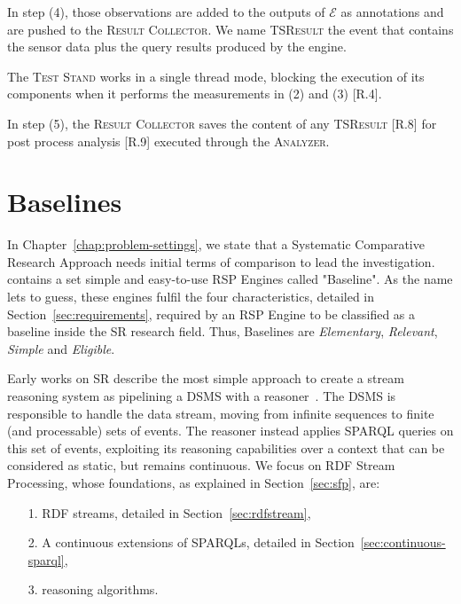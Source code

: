 In step (4), those observations are added to the outputs of $\mathcal{E}$ as annotations and are pushed to the \textsc{Result Collector}.  We name \textsc{TSResult} the event that contains the sensor data plus the query results produced by the engine.  

The \textsc{Test Stand} works in a single thread mode, blocking the execution of its components when it performs the measurements in (2) and (3) [R.4].  

In step (5), the \textsc{Result Collector} saves the content of any \textsc{TSResult} [R.8] for post process analysis [R.9] executed through the \textsc{Analyzer}.

\section{Baselines}\label{sec:baselines}

\noindent In Chapter~\ref{chap:problem-settings}, we state that a Systematic Comparative Research Approach needs initial terms of comparison to lead the investigation. \name contains a set simple and easy-to-use RSP Engines called "Baseline". As the name lets to guess, these engines fulfil the four characteristics, detailed in Section~\ref{sec:requirements}, required by an RSP Engine to be classified as a baseline inside the SR research field. Thus, \name Baselines are \textit{Elementary}, \textit{Relevant}, \textit{Simple} and \textit{Eligible}.

Early works on SR describe the most simple approach to create a stream reasoning system as pipelining a DSMS with a reasoner~\cite{DBLP:conf/fis/ValleCBBC08,Walavalkar08streamingknowledge}. The DSMS is responsible to handle the data stream, moving from infinite sequences to finite (and processable) sets of events. The reasoner instead applies SPARQL queries on this set of events, exploiting its reasoning capabilities over a context that can be considered as static, but remains continuous. We focus on RDF Stream Processing, whose foundations, as explained in Section~\ref{sec:sfp}, are: 
\begin{enumerate}
\item[1.] RDF streams, detailed in Section~\ref{sec:rdfstream},
\item[2.] A continuous extensions of SPARQLs, detailed in Section~\ref{sec:continuous-sparql},
\item[3.] reasoning algorithms.
\end{enumerate}

